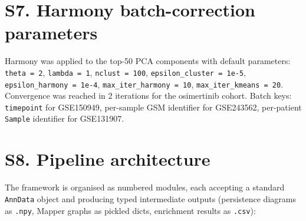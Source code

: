 \documentclass[11pt,a4paper]{article}
\begin{document}
\section*{S7. Harmony batch-correction parameters}

Harmony \citep{korsunsky2019} was applied to the top-50 PCA components
with default parameters: \texttt{theta = 2}, \texttt{lambda = 1},
\texttt{nclust = 100}, \texttt{epsilon\_cluster = 1e-5},
\texttt{epsilon\_harmony = 1e-4}, \texttt{max\_iter\_harmony = 10},
\texttt{max\_iter\_kmeans = 20}. Convergence was reached in 2
iterations for the osimertinib cohort. Batch keys: \texttt{timepoint}
for GSE150949, per-sample GSM identifier for GSE243562, per-patient
\texttt{Sample} identifier for GSE131907.

\section*{S8. Pipeline architecture}

The framework is organised as numbered modules, each accepting a
standard \texttt{AnnData} object and producing typed intermediate
outputs (persistence diagrams as \texttt{.npy}, Mapper graphs as
pickled dicts, enrichment results as \texttt{.csv}):
\end{document}
